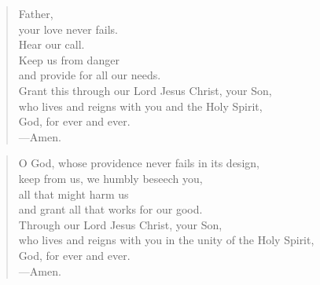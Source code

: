 \prayer

\setlength{\leftmargini}{\prayerleftmargini}

\begin{verse}
Father,\\
your love never fails.\\
Hear our call.\\
Keep us from danger\\
and provide for all our needs.\\
Grant this through our Lord Jesus Christ, your Son,\\
who lives and reigns with you and the Holy Spirit,\\
God, for ever and ever.\\
{\color{red}---\thinspace}Amen.
\end{verse}


\begin{verse}
O God, whose providence never fails in its design,\\
keep from us, we humbly beseech you,\\
all that might harm us\\
and grant all that works for our good.\\
Through our Lord Jesus Christ, your Son,\\
who lives and reigns with you in the unity of the Holy Spirit,\\
God, for ever and ever.\\
{\color{red}---\thinspace}Amen.
\end{verse}

\setlength{\leftmargini}{\defleftmargini}